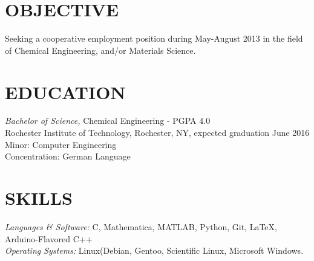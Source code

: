 \documentclass[line,margin]{res}
\begin{document}
\address{3241 Nathaniel Rochester Hall, Rochester, NY 14623}
\address{(315) 391-7268 - tmw4661@rit.edu}

\begin{resume}
 
\section{OBJECTIVE}       Seeking a cooperative employment position during May-August
						  2013 in the field of Chemical Engineering, and/or
						  Materials Science.
 
\section{EDUCATION} {\sl Bachelor of Science,} Chemical Engineering - PGPA 4.0 \\
                Rochester Institute of Technology, Rochester, NY, 
                expected graduation June 2016 \\
                Minor: Computer Engineering \\
                Concentration: German Language \\
\section{SKILLS} {\sl Languages \& Software:} C, Mathematica,
						MATLAB, Python, Git, \LaTeX, Arduino-Flavored C++\\
                {\sl Operating Systems:} Linux(Debian, Gentoo, Scientific Linux, Microsoft Windows.


\end{resume}
\end{document}
